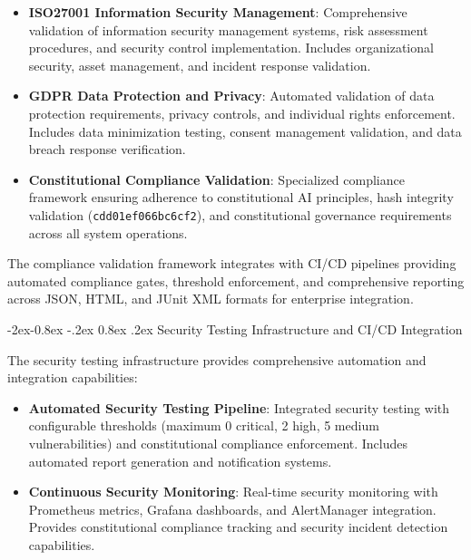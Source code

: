 \documentclass[manuscript,screen,9pt]{acmart}
\makeatletter
\renewcommand\subsubsection{\@startsection{subsubsection}{3}{\z@}%
  {-2ex\@plus -0.8ex \@minus -.2ex}%
  {0.8ex \@plus .2ex}%
  {\normalfont\normalsize\bfseries}}
\makeatother
\begin{document}
\begin{table}[!htb]
\begin{itemize}[leftmargin=*,itemsep=2pt,parsep=1pt]
    \item \textbf{ISO27001 Information Security Management}: Comprehensive validation of information security management systems, risk assessment procedures, and security control implementation. Includes organizational security, asset management, and incident response validation.

    \item \textbf{GDPR Data Protection and Privacy}: Automated validation of data protection requirements, privacy controls, and individual rights enforcement. Includes data minimization testing, consent management validation, and data breach response verification.

    \item \textbf{Constitutional Compliance Validation}: Specialized compliance framework ensuring adherence to constitutional AI principles, hash integrity validation (\texttt{cdd01ef066bc6cf2}), and constitutional governance requirements across all system operations.
\end{itemize}

The compliance validation framework integrates with CI/CD pipelines providing automated compliance gates, threshold enforcement, and comprehensive reporting across JSON, HTML, and JUnit XML formats for enterprise integration.

\subsubsection{Security Testing Infrastructure and CI/CD Integration}
\label{subsubsec:security_infrastructure}

The security testing infrastructure provides comprehensive automation and integration capabilities:

\begin{itemize}[leftmargin=*,itemsep=2pt,parsep=1pt]
    \item \textbf{Automated Security Testing Pipeline}: Integrated security testing with configurable thresholds (maximum 0 critical, 2 high, 5 medium vulnerabilities) and constitutional compliance enforcement. Includes automated report generation and notification systems.

    \item \textbf{Continuous Security Monitoring}: Real-time security monitoring with Prometheus metrics, Grafana dashboards, and AlertManager integration. Provides constitutional compliance tracking and security incident detection capabilities.


\end{itemize}
\end{table}
\end{document}
